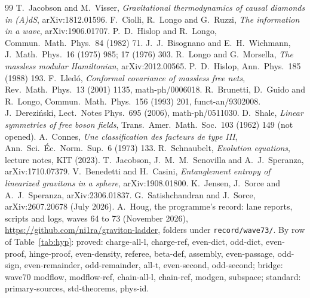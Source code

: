 \documentclass[11pt]{article}
\begin{document}
\begin{thebibliography}{99}\footnotesize\itemsep0pt
 T.~Jacobson and M.~Visser, \emph{Gravitational thermodynamics of causal diamonds in (A)dS}, arXiv:1812.01596.
 F.~Ciolli, R.~Longo and G.~Ruzzi, \emph{The information in a wave}, arXiv:1906.01707.
 P.~D.~Hislop and R.~Longo, Commun.\ Math.\ Phys.\ 84 (1982) 71.
 J.~J.~Bisognano and E.~H.~Wichmann, J.\ Math.\ Phys.\ 16 (1975) 985; 17 (1976) 303.
 R.~Longo and G.~Morsella, \emph{The massless modular Hamiltonian}, arXiv:2012.00565.
 P.~D.~Hislop, Ann.\ Phys.\ 185 (1988) 193.
 F.~Lled\'o, \emph{Conformal covariance of massless free nets}, Rev.\ Math.\ Phys.\ 13 (2001) 1135, math-ph/0006018.
 R.~Brunetti, D.~Guido and R.~Longo, Commun.\ Math.\ Phys.\ 156 (1993) 201, funct-an/9302008.
 J.~Dere\-zi\'nski, Lect.\ Notes Phys.\ 695 (2006), math-ph/0511030.
 D.~Shale, \emph{Linear symmetries of free boson fields}, Trans.\ Amer.\ Math.\ Soc.\ 103 (1962) 149 (not opened).
 A.~Connes, \emph{Une classification des facteurs de type III}, Ann.\ Sci.\ \'Ec.\ Norm.\ Sup.\ 6 (1973) 133.
 R.~Schnaubelt, \emph{Evolution equations}, lecture notes, KIT (2023).
 T.~Jacobson, J.~M.~M.~Senovilla and A.~J.~Speranza, arXiv:1710.07379.
 V.~Benedetti and H.~Casini, \emph{Entanglement entropy of linearized gravitons in a sphere}, arXiv:1908.01800.
 K.~Jensen, J.~Sorce and A.~J.~Speranza, arXiv:2306.01837.
 G.~Satishchandran and J.~Sorce, arXiv:2607.20678 (July 2026).
 A.~Houg, the programme's record: lane reports, scripts and logs, waves 64 to 73 (November 2026), \url{https://github.com/ni1ra/graviton-ladder}, folders under \texttt{record/wave73/}. By row of Table~\ref{tab:hyp}: proved: charge-all-l, charge-ref, even-dict, odd-dict, even-proof, hinge-proof, even-density, referee, beta-def, assembly, even-passage, odd-sign, even-remainder, odd-remainder, all-t, even-second, odd-second; bridge: wave70 modflow, modflow-ref, chain-all-l, chain-ref, modgen, subspace; standard: primary-sources, std-theorems, phys-id.
\end{thebibliography}
\end{document}
